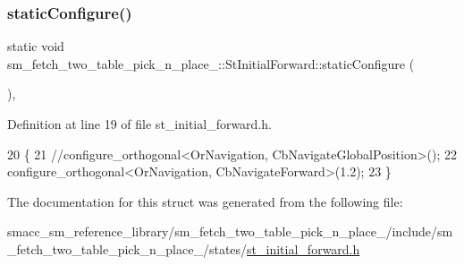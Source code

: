 \subsubsection{\texorpdfstring{static\+Configure()}{staticConfigure()}}
{\footnotesize\ttfamily static void sm\+\_\+fetch\+\_\+two\+\_\+table\+\_\+pick\+\_\+n\+\_\+place\+\_\+::\+St\+Initial\+Forward\+::static\+Configure (\begin{DoxyParamCaption}{ }\end{DoxyParamCaption})\hspace{0.3cm}{\ttfamily [inline]}, {\ttfamily [static]}}



Definition at line 19 of file st\+\_\+initial\+\_\+forward.\+h.


\begin{DoxyCode}
20         \{
21             \textcolor{comment}{//configure\_orthogonal<OrNavigation, CbNavigateGlobalPosition>();}
22             configure\_orthogonal<OrNavigation, CbNavigateForward>(1.2);
23         \}
\end{DoxyCode}


The documentation for this struct was generated from the following file\+:\begin{DoxyCompactItemize}
\item 
smacc\+\_\+sm\+\_\+reference\+\_\+library/sm\+\_\+fetch\+\_\+two\+\_\+table\+\_\+pick\+\_\+n\+\_\+place\+\_/include/sm\+\_\+fetch\+\_\+two\+\_\+table\+\_\+pick\+\_\+n\+\_\+place\+\_/states/\hyperlink{st__initial__forward_8h}{st\+\_\+initial\+\_\+forward.\+h}\end{DoxyCompactItemize}

